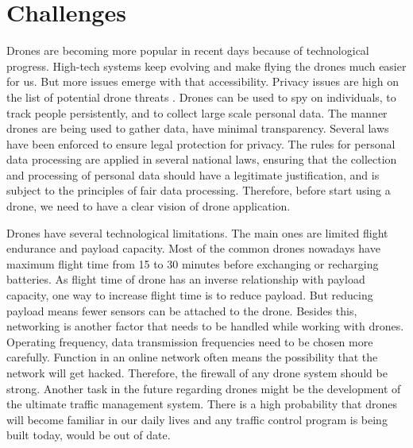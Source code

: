 \section{Challenges}
\label{challengesection}
Drones are becoming more popular in recent days because of technological progress. High-tech systems keep evolving and make flying the drones much easier for us. But more issues emerge with that accessibility. Privacy issues are high on the list of potential drone threats \cite{custers2016flying}. Drones can be used to spy on individuals, to track people persistently, and to collect large scale personal data. The manner drones are being used to gather data, have minimal transparency. Several laws have been enforced to ensure legal protection for privacy. The rules for personal data processing are applied in several national laws, ensuring that the collection and processing of personal data should have a legitimate justification, and is subject to the principles of fair data processing. Therefore, before start using a drone, we need to have a clear vision of drone application.

Drones have several technological limitations. The main ones are limited flight endurance and payload capacity. Most of the common drones nowadays have maximum flight time from 15 to 30 minutes before exchanging or recharging batteries. As flight time of drone has an inverse relationship with payload capacity, one way to increase flight time is to reduce payload. But reducing payload means fewer sensors can be attached to the drone. Besides this, networking is another factor that needs to be handled while working with drones. Operating frequency, data transmission frequencies need to be chosen more carefully. Function in an online network often means the possibility that the network will get hacked. Therefore, the firewall of any drone system should be strong. Another task in the future regarding drones might be the development of the ultimate traffic management system. There is a high probability that drones will become familiar in our daily lives and any traffic control program is being built today, would be out of date.